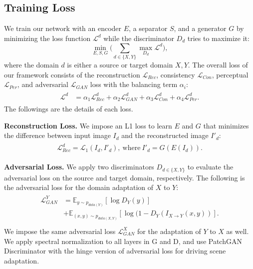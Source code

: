 \documentclass[final]{cvpr}
\begin{document}
\subsection{Training Loss}
\label{sec:Loss}
We train our network with an encoder $E$, a separator $S$, and a generator $G$ by minimizing the loss function $\mathcal{L}^d$ while the discriminator $D_d$ tries to maximize it:
\begin{equation}
    \min_{E,S,G} \bigg(\sum_{d \in \{X, Y\}} \max_{D_d} \mathcal{L}^d\bigg),
\end{equation}
where the domain $d$ is either a source or target domain $X, Y$.
The overall loss of our framework consists of the reconstruction $\mathcal{L}_{Rec}$, consistency $\mathcal{L}_{Con}$, perceptual $\mathcal{L}_{Per}$, and adversarial $\mathcal{L}_{GAN}$ loss with the balancing term $\alpha_i$:
\begin{gather}
\begin{split}
\mathcal{L}^d & = \alpha _1 \mathcal{L}_{Rec}^d + \alpha _2 \mathcal{L}_{GAN}^d + \alpha _3 \mathcal{L}_{Con}^d + \alpha _4 \mathcal{L}_{Per}^d.
\end{split}
\end{gather}
The followings are the details of each loss.

\textbf{Reconstruction Loss.} \quad
We impose an L1 loss to learn $E$ and $G$ that minimizes the difference between input image $I_d$ and the reconstructed image $I'_d$:
\begin{gather}
\begin{split}
    \mathcal{L}_{Rec}^d 
    = \mathcal{L}_1(I_d, I'_d),~\text{where}~I'_d=G(E(I_d)).
\end{split}
\end{gather}

\textbf{Adversarial Loss.} \quad
We apply two discriminators $D_{d\in \{X, Y\}}$ to evaluate the adversarial loss on the source and target domain, respectively.
The following is the adversarial loss for the domain adaptation of $X$ to $Y$:
\begin{gather}
\label{eq:Y}
\begin{split}
    \mathcal{L}_{GAN}^Y
    & = \mathbb{E}_{y \sim p_{data \left (Y \right ) }} \left[ \log D_Y(y) \right ] \\
    &+ \mathbb{E}_{(x,y) \sim p_{data \left (X, Y \right ) }} \left[ \log (1 - D_Y(I_{X \to Y}(x,y)) \right ]. \\
\end{split}
\end{gather}
We impose the same adversarial loss $\mathcal{L}_{GAN}^X$ for the adaptation of $Y$ to $X$ as well.
We apply spectral normalization \cite{miyato2018spectral} to all layers in G and D, and use PatchGAN Discriminator \cite{isola2017image} with the hinge version of adversarial loss \cite{lim2017geometric, tran2017deep,miyato2018cgans, zhang2019self} for driving scene adaptation.
\end{document}
